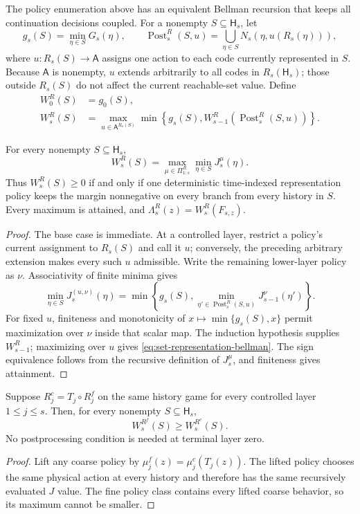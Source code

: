 The policy enumeration above has an equivalent Bellman recursion that keeps all continuation
decisions coupled.  For a nonempty $S\subseteq\mathsf H_s$, let
\[
 g_s(S)=\min_{\eta\in S}G_s(\eta),
 \qquad
 \operatorname{Post}_s^R(S,u)
 =\bigcup_{\eta\in S}N_s\!\left(\eta,u(R_s(\eta))\right),
\]
where $u:R_s(S)\to\mathsf A$ assigns one action to each code currently represented in $S$.
Because $\mathsf A$ is nonempty, $u$ extends arbitrarily to all codes in $R_s(\mathsf H_s)$; those
outside $R_s(S)$ do not affect the current reachable-set value.
Define
\begin{align}
 W_0^R(S)&=g_0(S),\nonumber\\
 W_s^R(S)&=\max_{u\in\mathsf A^{R_s(S)}}
 \min\left\{g_s(S),
 W_{s-1}^R\!\left(\operatorname{Post}_s^R(S,u)\right)\right\}.
 \label{eq:set-representation-bellman}
\end{align}

\begin{theorem}
\label{thm:set-representation-bellman}
For every nonempty $S\subseteq\mathsf H_s$,
\[
 W_s^R(S)=\max_{\mu\in\Pi_{1:s}^R}\min_{\eta\in S}J_s^\mu(\eta).
\]
Thus $W_s^R(S)\geq0$ if and only if one deterministic time-indexed representation policy keeps the
margin nonnegative on every branch from every history in $S$.  Every maximum is attained, and
$\Lambda_s^R(z)=W_s^R(F_{s,z})$.
\end{theorem}
\begin{proof}
The base case is immediate.  At a controlled layer, restrict a policy's current assignment to
$R_s(S)$ and call it $u$; conversely, the preceding arbitrary extension makes every such $u$
admissible.  Write the remaining lower-layer policy as $\nu$.  Associativity of finite minima gives
\[
 \min_{\eta\in S}J_s^{(u,\nu)}(\eta)
 =\min\left\{g_s(S),
 \min_{\eta'\in\operatorname{Post}_s^R(S,u)}J_{s-1}^\nu(\eta')\right\}.
\]
For fixed $u$, finiteness and monotonicity of $x\mapsto\min\{g_s(S),x\}$ permit maximization over
$\nu$ inside that scalar map.  The induction hypothesis supplies $W_{s-1}^R$; maximizing over $u$
gives \eqref{eq:set-representation-bellman}.  The sign equivalence follows from the recursive
definition of $J_s^\mu$, and finiteness gives attainment.
\end{proof}

\begin{proposition}
\label{prop:dynamic-viability-data-processing}
Suppose $R_j^c=T_j\circ R_j^f$ on the same history game for every controlled layer
$1\leq j\leq s$.  Then, for every nonempty $S\subseteq\mathsf H_s$,
\[
 W_s^{R^f}(S)\geq W_s^{R^c}(S).
\]
No postprocessing condition is needed at terminal layer zero.
\end{proposition}
\begin{proof}
Lift any coarse policy by $\mu_j^f(z)=\mu_j^c(T_j(z))$.  The lifted policy chooses the same physical
action at every history and therefore has the same recursively evaluated $J$ value.  The fine
policy class contains every lifted coarse behavior, so its maximum cannot be smaller.
\end{proof}

